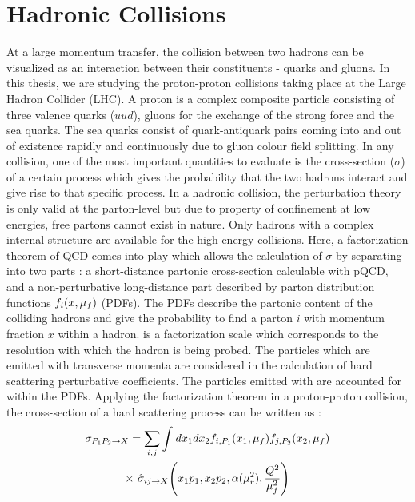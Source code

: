 \section{Hadronic Collisions}
At a large momentum transfer, the collision between two hadrons can be visualized as an interaction between their constituents - quarks and gluons. In this thesis, we are studying the proton-proton collisions taking place at the Large Hadron Collider (LHC). A proton is a complex composite particle consisting of three valence quarks ($uud$), gluons for the exchange of the strong force and the sea quarks. The sea quarks consist of quark-antiquark pairs coming into and out of existence rapidly and continuously due to gluon colour field splitting. In any collision, one of the most important quantities to evaluate is the cross-section ($\sigma$) of a certain process which gives the probability that the two hadrons interact and give rise to that specific process. In a hadronic collision, the perturbation theory is only valid at the parton-level but due to property of confinement at low energies, free partons cannot exist in nature. Only hadrons with a complex internal structure are available for the high energy collisions. Here, a factorization theorem of QCD \cite{Collins:1989gx} comes into play which allows the calculation of $\sigma$ by separating into two parts : a short-distance partonic cross-section calculable with pQCD, and a non-perturbative long-distance part described by parton distribution functions $f_i(x,\mu_f)$ (PDFs). The PDFs describe the partonic content of the colliding hadrons and give the probability to find a parton $i$ with momentum fraction $x$ within a hadron. \muf is a factorization scale which corresponds to the resolution with which the hadron is being probed. The particles which are emitted with transverse momenta \pt \gr \muf are considered in the calculation of hard scattering perturbative coefficients. The particles emitted with \pt \ls \muf are accounted for within the PDFs. Applying the factorization theorem in a proton-proton collision, the cross-section of a hard scattering process can be written as :
\begin{equation}
\begin{gathered}
\sigma_{P_1P_2 \rightarrow X} = \sum\limits_{i,j}^{}\int_{}^{} dx_1dx_2f_{i,P_1}(x_1,\muf)f_{j,P_2}(x_2,\muf)\\\times~\hat\sigma_{ij\rightarrow X} \Bigg(x_1p_1,x_2p_2,\alpha(\mur^2),\frac{Q^2}{\muf^2}\Bigg)
\end{gathered}
\end{equation}
